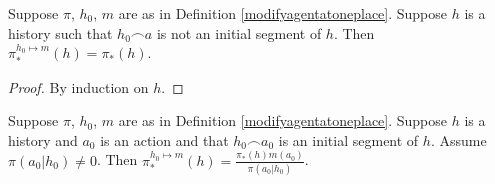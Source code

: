 \documentclass[runningheads]{llncs}
\begin{document}
\begin{lemma}
\label{firsttechlemmaforgenericity}
    Suppose $\pi$, $h_0$, $m$ are as in Definition \ref{modifyagentatoneplace}.
    Suppose $h$ is a history such that
    $h_0\frown a$ is not an initial segment of $h$.
    Then $\pi^{h_0\mapsto m}_*(h)=\pi_*(h)$.
\end{lemma}

\begin{proof}
    By induction on $h$.
\end{proof}

\begin{lemma}
\label{secondtechlemmaforgenericity}
    Suppose $\pi$, $h_0$, $m$ are as in Definition \ref{modifyagentatoneplace}.
    Suppose $h$ is a history and $a_0$ is an action and that $h_0\frown a_0$ is
    an initial segment of $h$. Assume $\pi(a_0|h_0)\not=0$. Then
    $\pi^{h_0\mapsto m}_*(h) = \frac{\pi_*(h)m(a_0)}{\pi(a_0|h_0)}$.
\end{lemma}
\end{document}

